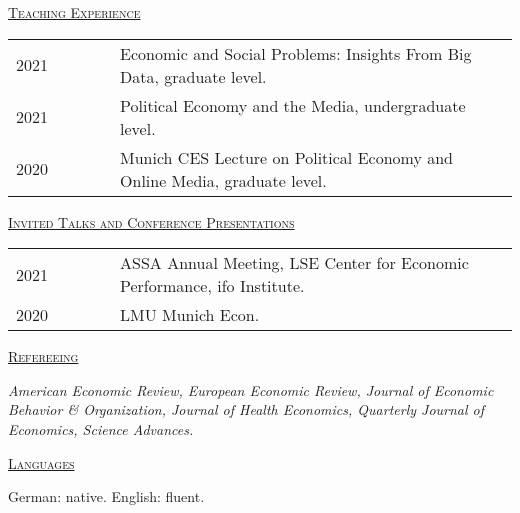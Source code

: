 \documentclass[letterpaper,11pt]{article}
\begin{document}
\bigskip
 
\underline {\textsc{Teaching Experience}}

\begin{tabular}{@{}l@{}cl@{}cl}
2021 & \ \ \ \ \ & Economic and Social Problems: Insights From Big Data, graduate level. \\
2021 & \ \ \ \ \ & Political Economy and the Media, undergraduate level. \\
2020 & \ \ \ \ \ & Munich CES Lecture on Political Economy and Online Media, graduate level. \\
\end{tabular}

\bigskip
 
\underline {\textsc{Invited Talks and Conference Presentations}}

\begin{tabular}{@{}l@{}cl@{}cl}
2021 & \ \ \ \ \ & ASSA Annual Meeting, LSE Center for Economic Performance, ifo Institute. \\
2020 & \ \ \ \ \ & LMU Munich Econ. \\
\end{tabular}

\bigskip
 
\underline {\textsc{Refereeing}}

\textit{American Economic Review, European Economic Review, Journal of Economic Behavior \& Organization, Journal of Health Economics, Quarterly Journal of Economics, Science Advances.}

\bigskip
 
\underline {\textsc{Languages}}

German: native. English: fluent.
\end{document}
